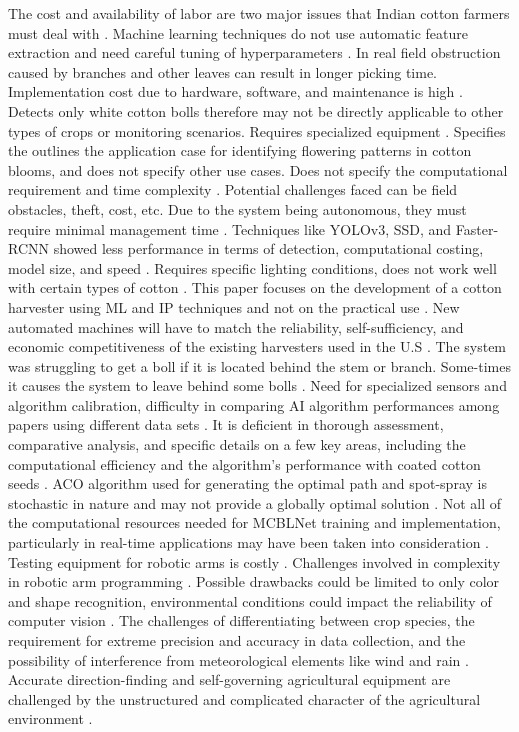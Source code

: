 \documentclass[12pt,a4paper]{report}
\begin{document}
The cost and availability of labor are two major issues that Indian cotton farmers must deal with \cite{r1}. Machine learning techniques do not use automatic feature extraction and need careful tuning of hyperparameters \cite{r4}. In real field obstruction caused by branches and other leaves can result in longer picking time. Implementation cost due to hardware, software, and maintenance is high \cite{r5}. Detects only white cotton bolls therefore may not be directly applicable to other types of crops or monitoring scenarios. Requires specialized equipment \cite{r6}. Specifies the outlines the application case for identifying flowering patterns in cotton blooms, and does not specify other use cases. Does not specify the computational requirement and time complexity \cite{r7}. Potential challenges faced can be field obstacles, theft, cost, etc. Due to the system being autonomous, they must require minimal management time \cite{r9}. Techniques like YOLOv3, SSD, and Faster-RCNN showed less performance in terms of detection, computational costing, model size, and speed \cite{r10}. Requires specific lighting conditions, does not work well with certain types of cotton \cite{r11}. This paper focuses on the development of a cotton harvester using ML and IP techniques and not on the practical use \cite{r12}. New automated machines will have to match the reliability, self-sufficiency, and economic competitiveness of the existing harvesters used in the U.S \cite{r13}. The system was struggling to get a boll if it is located behind the stem or branch. Some-times it causes the system to leave behind some bolls \cite{r14}. Need for specialized sensors and algorithm calibration, difficulty in comparing AI algorithm performances among papers using different data sets \cite{r15}. It is deficient in thorough assessment, comparative analysis, and specific details on a few key areas, including the computational efficiency and the algorithm's performance with coated cotton seeds \cite{r16}. ACO algorithm used for generating the optimal path and spot-spray is stochastic in nature and may not provide a globally optimal solution \cite{r17}. Not all of the computational resources needed for MCBLNet training and implementation, particularly in real-time applications may have been taken into consideration \cite{r19}. Testing equipment for robotic arms is costly \cite{r20}. Challenges involved in complexity in robotic arm programming \cite{r21}. Possible drawbacks could be limited to only color and shape recognition, environmental conditions could impact the reliability of computer vision \cite{r22}. The challenges of differentiating between crop species, the requirement for extreme precision and accuracy in data collection, and the possibility of interference from meteorological elements like wind and rain \cite{r23}. Accurate direction-finding and self-governing agricultural equipment are challenged by the unstructured and complicated character of the agricultural environment \cite{r24}.
\end{document}
